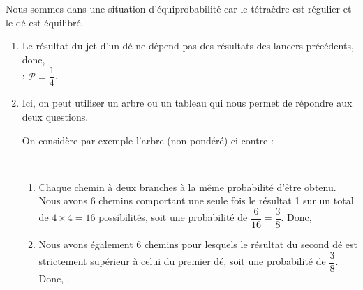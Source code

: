    Nous sommes dans une situation d'équiprobabilité car le tétraèdre est régulier et le dé est équilibré. \\
   \begin{enumerate}
      \item Le résultat du jet d'un dé ne dépend pas des résultats des lancers précédents, donc, \\ [1mm]
       : $\mathcal{P} =\dfrac14$.
      \item Ici, on peut utiliser un arbre ou un tableau qui nous permet de répondre aux deux questions. \\ [4mm]
      \begin{minipage}{5cm}
         On considère par exemple l'arbre (non pondéré) ci-contre :
      \end{minipage}
      \qquad
      \begin{minipage}{10cm}
       \\ [4mm]
      \end{minipage}
      \begin{enumerate}
         \item Chaque chemin à deux branches à la même probabilité d'être obtenu. \\
         Nous avons 6 chemins comportant une seule fois le résultat 1 sur un total de $4\times4 =16$ possibilités, soit une probabilité de $\dfrac{6}{16} =\dfrac38$. Donc, 
         \smallskip
         \item Nous avons également 6 chemins pour lesquels le résultat du second dé est strictement supérieur à celui du premier dé, soit une probabilité de $\dfrac38$. Donc, .
      \end{enumerate}
   \end{enumerate}
